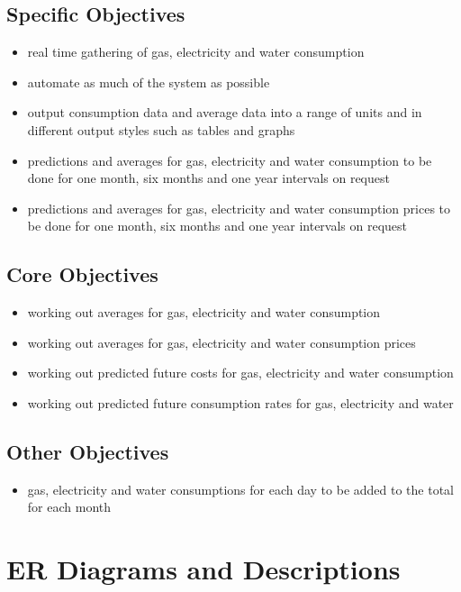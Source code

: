 \subsection{Specific Objectives}
\begin{itemize}
	\item real time gathering of gas, electricity and water consumption
	\item automate as much of the system as possible
	\item output consumption data and average data into a range of units and in different output styles such as tables and graphs 
	\item predictions and averages for gas, electricity and water consumption to be done for one month, six months and one year intervals on request
	\item predictions and averages for gas, electricity and water consumption prices to be done for one month, six months and one year intervals on request
\end{itemize}
\subsection{Core Objectives}
\begin{itemize}
	\item working out averages for gas, electricity and water consumption
	\item working out averages for gas, electricity and water consumption prices
	\item working out predicted future costs for gas, electricity and water consumption
	\item working out predicted future consumption rates for gas, electricity and water
\end{itemize}
\subsection{Other Objectives}
\begin{itemize}
	\item gas, electricity and water consumptions for each day to be added to the total for each month
\end{itemize}
\section{ER Diagrams and Descriptions}

